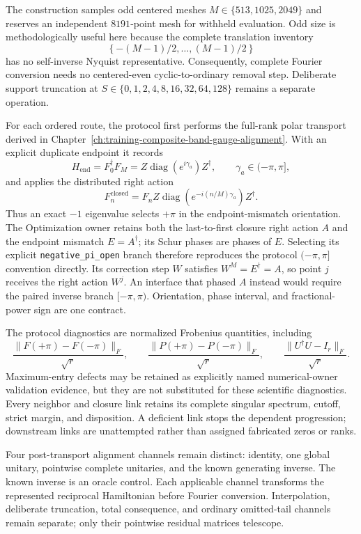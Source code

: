 The construction samples odd centered meshes
$M\in\{513,1025,2049\}$ and reserves an independent $8191$-point mesh for
withheld evaluation.  Odd size is methodologically useful here because the
complete translation inventory
\[
  \left\{-(M-1)/2,\ldots,(M-1)/2\right\}
\]
has no self-inverse Nyquist representative.  Consequently, complete Fourier
conversion needs no centered-even cyclic-to-ordinary removal step.  Deliberate
support truncation at
$S\in\{0,1,2,4,8,16,32,64,128\}$ remains a separate operation.

For each ordered route, the protocol first performs the full-rank polar
transport derived in
Chapter~\ref{ch:training-composite-band-gauge-alignment}.  With an explicit duplicate
endpoint it records
\[
  H_{\mathrm{end}}=F_0^\dagger F_M
  =Z\operatorname{diag}(e^{i\gamma_a})Z^\dagger,
  \qquad \gamma_a\in(-\pi,\pi],
\]
and applies the distributed right action
\[
  F_n^{\mathrm{closed}}
  =F_n Z\operatorname{diag}(e^{-i(n/M)\gamma_a})Z^\dagger.
\]
Thus an exact $-1$ eigenvalue selects $+\pi$ in the endpoint-mismatch
orientation.  The Optimization owner retains both the last-to-first closure
right action $A$ and the endpoint mismatch $E=A^\dagger$; its Schur phases are
phases of $E$.  Selecting its explicit \texttt{negative\_pi\_open} branch
therefore reproduces the protocol $(-\pi,\pi]$ convention directly.  Its
correction step $W$ satisfies $W^M=E^\dagger=A$, so point $j$ receives the right
action $W^j$.  An interface that phased $A$ instead would require the paired
inverse branch $[-\pi,\pi)$.  Orientation, phase interval, and fractional-power
sign are one contract.

The protocol diagnostics are normalized Frobenius quantities, including
\[
  \frac{\lVert F(+\pi)-F(-\pi)\rVert_F}{\sqrt r},
  \qquad
  \frac{\lVert P(+\pi)-P(-\pi)\rVert_F}{\sqrt r},
  \qquad
  \frac{\lVert U^\dagger U-I_r\rVert_F}{\sqrt r}.
\]
Maximum-entry defects may be retained as explicitly named numerical-owner
validation evidence, but they are not substituted for these scientific
diagnostics.  Every neighbor and closure link retains its complete singular
spectrum, cutoff, strict margin, and disposition.  A deficient link stops the
dependent progression; downstream links are unattempted rather than assigned
fabricated zeros or ranks.

Four post-transport alignment channels remain distinct: identity, one global
unitary, pointwise complete unitaries, and the known generating inverse.  The
known inverse is an oracle control.  Each applicable channel transforms the
represented reciprocal Hamiltonian before Fourier conversion.  Interpolation,
deliberate truncation, total consequence, and ordinary omitted-tail channels
remain separate; only their pointwise residual matrices telescope.

